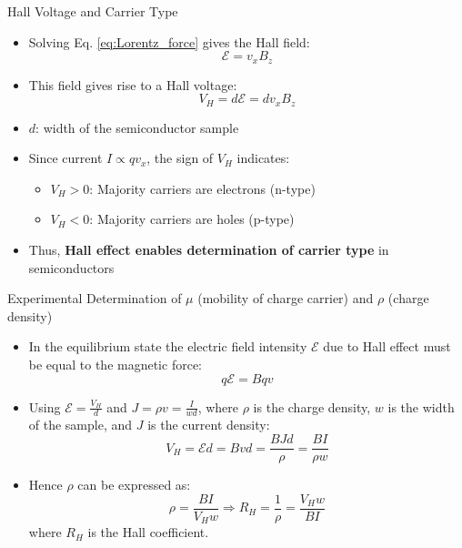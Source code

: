 \begin{frame}{Hall Voltage and Carrier Type}
    \begin{itemize}
        \item Solving Eq. \ref{eq:Lorentz_force} gives the Hall field:
        \begin{equation}
            \mathcal{E} = v_x B_z 
        \end{equation}
        \item This field gives rise to a Hall voltage:
        \begin{equation}
        V_H = d \mathcal{E} = d v_x B_z
        \end{equation}
        \item $d$: width of the semiconductor sample
        \item Since current $I \propto q v_x$, the sign of $V_H$ indicates:
        \begin{itemize}
            \item $V_H > 0$: Majority carriers are electrons (n-type)
            \item $V_H < 0$: Majority carriers are holes (p-type)
        \end{itemize}
        \item Thus, \textbf{Hall effect enables determination of carrier type} in semiconductors
    \end{itemize}
\end{frame}


\begin{frame}{Experimental Determination of $\mu$ (mobility of charge carrier) and $\rho$ (charge density)}
    \begin{itemize}
        \item In the equilibrium state the electric field intensity $\mathcal{E}$ due to Hall effect must be equal to the magnetic force:
        \begin{equation}
        q\mathcal{E} = Bqv \tag{2-21}
        \end{equation}
        \item Using $\mathcal{E} = \frac{V_H}{d}$ and $J = \rho v = \frac{I}{wd}$, where $\rho$ is the charge density, $w$ is the width of the sample, and $J$ is the current density:
        \begin{equation}
        V_H = \mathcal{E}d = Bvd = \frac{BJd}{\rho} = \frac{BI}{\rho w} \tag{2-22}
        \end{equation}
        \item Hence $\rho$ can be expressed as:
        \begin{equation}
        \rho = \frac{BI}{V_H w} \Rightarrow R_H = \frac{1}{\rho} = \frac{V_H w}{BI} \tag{2-23, 2-24}
        \end{equation}
        where $R_H$ is the Hall coefficient.
    \end{itemize}
\end{frame}

